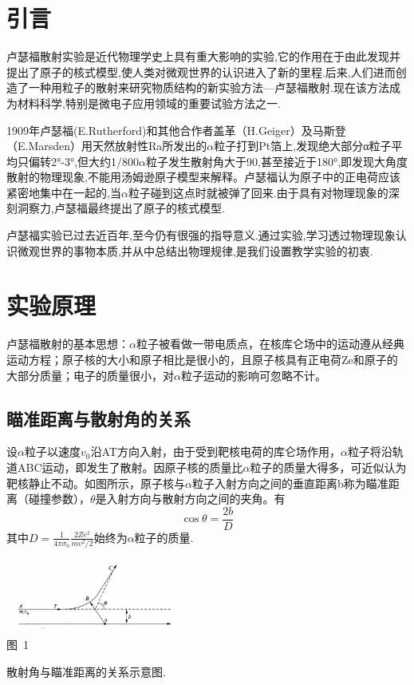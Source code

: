 \documentclass[a4paper,10.0pt,twoside]{npr}
\begin{document}
\begin{multicols}{2}

\section{引言}    %
\vspace*{-1mm}
\song\wuhao
卢瑟福散射实验是近代物理学史上具有重大影响的实验,它的作用在于由此发现并提出了原子的核式模型,使人类对微观世界的认识进入了新的里程.后来,人们进而创造了一种用粒子的散射来研究物质结构的新实验方法—卢瑟福散射.现在该方法成为材料科学,特别是微电子应用领域的重要试验方法之一.

1909年卢瑟福(E.Rutherford)和其他合作者盖革（H.Geiger）及马斯登（E.Marsden）用天然放射性Ra所发出的$\alpha$粒子打到Pt箔上,发现绝大部分α粒子平均只偏转2°-3°,但大约1/800$\alpha$粒子发生散射角大于90,甚至接近于180°,即发现大角度散射的物理现象,不能用汤姆逊原子模型来解释。卢瑟福认为原子中的正电荷应该紧密地集中在一起的,当$\alpha$粒子碰到这点时就被弹了回来.由于具有对物理现象的深刻洞察力,卢瑟福最终提出了原子的核式模型.

卢瑟福实验已过去近百年,至今仍有很强的指导意义.通过实验,学习透过物理现象认识微观世界的事物本质,并从中总结出物理规律,是我们设置教学实验的初衷.
\section{实验原理}

卢瑟福散射的基本思想：$\alpha$粒子被看做一带电质点，在核库仑场中的运动遵从经典运动方程；原子核的大小和原子相比是很小的，且原子核具有正电荷Ze和原子的大部分质量；电子的质量很小，对$\alpha$粒子运动的影响可忽略不计。

\subsection{瞄准距离与散射角的关系}

设$\alpha$粒子以速度$v_0$沿AT方向入射，由于受到靶核电荷的库仑场作用，$\alpha$粒子将沿轨道ABC运动，即发生了散射。因原子核的质量比$\alpha$粒子的质量大得多，可近似认为靶核静止不动。如图所示，原子核与$\alpha$粒子入射方向之间的垂直距离b称为瞄准距离（碰撞参数），$\theta$是入射方向与散射方向之间的夹角。有
\begin{equation}
	\cos{\theta} = \frac{2b}{D}
\end{equation}
其中$D=\frac{1}{4\pi \sigma_0}\frac{2Ze^2}{mv^2/2}$始终为$\alpha$粒子的质量.
\begin{center}
   \includegraphics[width=0.45\textwidth]{1.png}
\\
\xiaowu\song 图~1\begin{minipage}[t]{75mm} \quad 散射角与瞄准距离的关系示意图.\\[-1mm]\wuhao
\end{minipage}
\end{center}

\end{multicols}
\end{document}

